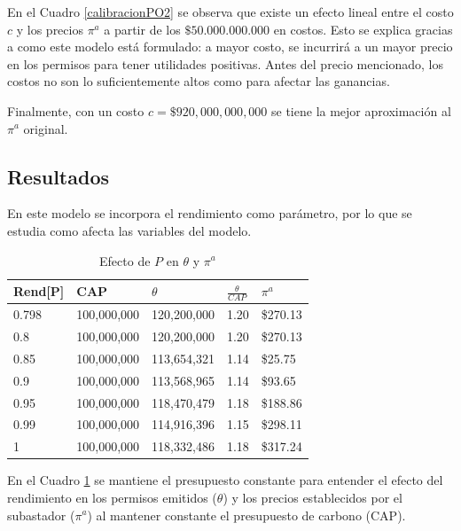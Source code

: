 En el Cuadro \ref{calibracionPO2} se observa que existe un efecto lineal entre el costo $c$ y los precios $\pi^a$ a partir de los $\$50.000.000.000$ en costos. Esto se explica gracias a como este modelo está formulado: a mayor costo, se incurrirá a un mayor precio en los permisos para tener utilidades positivas. Antes del precio mencionado, los costos no son lo suficientemente altos como para afectar las ganancias.
\vspace{2.5mm}

Finalmente, con un costo $c= \$ 920,000,000,000$ se tiene la mejor aproximación al $\pi^a$ original. 
\vspace{2.5mm}

\subsection{Resultados}

En este modelo se incorpora el rendimiento como parámetro, por lo que se estudia como afecta las variables del modelo.
\vspace{2.5mm}

\begin{table}[H]
    \centering
    \begin{tabular}{|l|l|l|l|l|}
    \hline
        Rend[P]  & CAP & $\theta$  & $\frac{\theta}{CAP}$  & $\pi^a$  \\ \hline
        0.798  & 100,000,000  & 120,200,000 & 1.20  &  \$270.13   \\ \hline
        0.8  & 100,000,000 & 120,200,000 & 1.20  &  \$270.13   \\ \hline
        0.85  & 100,000,000 & 113,654,321 & 1.14  &  \$25.75   \\ \hline
        0.9  & 100,000,000 & 113,568,965 & 1.14  &  \$93.65   \\ \hline
        0.95  & 100,000,000 & 118,470,479 & 1.18  &  \$188.86   \\ \hline
        0.99  & 100,000,000 & 114,916,396 & 1.15  &  \$298.11   \\ \hline
        1  & 100,000,000 & 118,332,486 & 1.18  &  \$317.24   \\ \hline
    \end{tabular}
    \caption{{\footnotesize Efecto de $P$ en $\theta$ y $\pi^a$}}
    \label{efectopenthetapia}
\end{table}


En el Cuadro \ref{efectopenthetapia} se mantiene el presupuesto constante para entender el efecto del rendimiento en los permisos emitidos ($\theta$) y los precios establecidos por el subastador ($\pi^a$) al mantener constante el presupuesto de carbono (CAP). 
\vspace{2.5mm}

